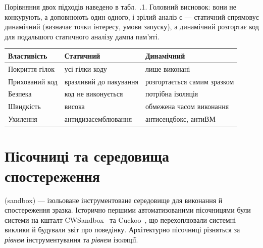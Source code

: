 \begin{tikzfig}
\end{tikzfig}

Порівняння двох підходів наведено в табл.~\thechapter.1. Головний висновок: вони не конкурують, а доповнюють один одного, і зрілий аналіз є  --- статичний спрямовує динамічний (визначає точки інтересу, умови запуску), а динамічний розгортає код для подальшого статичного аналізу дампа пам'яті.


\begin{center}\footnotesize
\begin{tabularx}{\linewidth}{L{22mm} Y Y}
\toprule
Властивість & Статичний & Динамічний \\
\midrule
Покриття гілок & усі гілки коду & лише виконані \\
Прихований код & вразливий до пакування & розгортається самим зразком \\
Безпека & код не виконується & потрібна ізоляція \\
Швидкість & висока & обмежена часом виконання \\
Ухилення & антидизасемблювання & антисендбокс, антиВМ \\
\bottomrule
\end{tabularx}
\end{center}

\section{Пісочниці та середовища спостереження}\label{sec:ch07-sandbox}

 (sandbox) --- ізольоване інструментоване середовище для виконання й спостереження зразка. Історично першими автоматизованими пісочницями були системи на кшталт CWSandbox~\cite{ch07:willems} та Cuckoo~\cite{ch07:cuckoo}, що перехоплювали системні виклики й будували звіт про поведінку. Архітектурно пісочниці різняться за \emph{рівнем} інструментування та \emph{рівнем} ізоляції.

